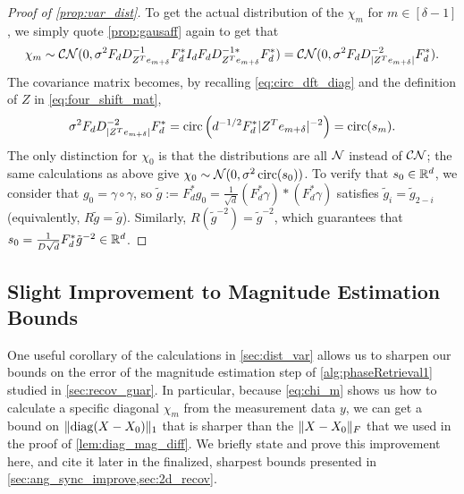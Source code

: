 \begin{proof}[Proof of \cref{prop:var_dist}]
  To get the actual distribution of the $\chi_m$ for $m \in [\delta - 1]$, we simply quote \cref{prop:gausaff} again to get that \[\chi_m \sim \mathcal{C N}(0, \sigma^2 F_d D^{-1}_{Z^T e_{m + \delta}} F_d^* I_d F_d D^{-1*}_{Z^T e_{m + \delta}} F_d^*) = \mathcal{C N}(0, \sigma^2 F_d D^{-2}_{\lvert Z^T e_{m + \delta}\rvert} F_d^*).\] The covariance matrix becomes, by recalling \eqref{eq:circ_dft_diag} and the definition of $Z$ in \eqref{eq:four_shift_mat}, \[\sigma^2 F_d D^{-2}_{\lvert Z^T e_{m + \delta}\rvert} F_d^* = \operatorname{circ}\left(d^{-1/2} F_d^* \lvert Z^T e_{m + \delta}\rvert^{-2}\right) = \operatorname{circ}(s_m).\]  The only distinction for $\chi_0$ is that the distributions are all $\mathcal{N}$ instead of $\mathcal{C N}$; the same calculations as above give $\chi_0 \sim \mathcal{N}(0, \sigma^2 \operatorname{circ}(s_0))$.  To verify that $s_0 \in \mathbb{R}^d$, we consider that $g_0 = \gamma \circ \gamma$, so $\tilde{g} := F_d^* g_0 = \frac{1}{\sqrt{d}} (F_d^* \gamma) * (F_d^* \gamma) $ satisfies $\tilde{g}_i = \tilde{g}_{2 - i}$ (equivalently, $R \tilde{g} = \tilde{g}$).  Similarly, $R(\tilde{g}^{-2}) = \tilde{g}^{-2}$, which guarantees that $s_0 = \frac{1}{D \sqrt{d}} F_d^* \tilde{g}^{-2} \in \mathbb{R}^d$.
\end{proof}

\subsection{Slight Improvement to Magnitude Estimation Bounds}

One useful corollary of the calculations in \cref{sec:dist_var} allows us to sharpen our bounds on the error of the magnitude estimation step of \cref{alg:phaseRetrieval1} studied in \cref{sec:recov_guar}.  In particular, because \eqref{eq:chi_m} shows us how to calculate a specific diagonal $\chi_m$ from the measurement data $y$, we can get a bound on $\lVert\operatorname{diag}(X - X_0)\rVert_1$ that is sharper than the $\lVert X - X_0\rVert_F$ that we used in the proof of \cref{lem:diag_mag_diff}.  We briefly state and prove this improvement here, and cite it later in the finalized, sharpest bounds presented in \cref{sec:ang_sync_improve,sec:2d_recov}.

